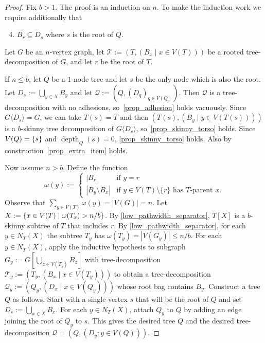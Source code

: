 \documentclass{patmorin}
\renewcommand{\le}{\leqslant}
\newcommand{\torso}[2]{{#1}\langle{#2}\rangle}
\DeclareMathOperator{\depth}{depth}
\DeclarePairedDelimiter{\set}{\{}{\}}
\begin{document}
  \begin{proof}
    Fix $b>1$.
    The proof is an induction on $n$.
    To make the induction work we require additionally that
    \begin{enumerate}[nosep,nolistsep,label=\rm(\alph*)]
    \setcounter{enumi}{3}
    \item\label{prop_extra_item} $B_r \subseteq D_s$ where $s$ is the root of $Q$.
    \end{enumerate}
    Let $G$ be an $n$-vertex graph, let $\mathcal{T}:=(T,(B_x\mid x\in V(T)))$ be a rooted tree-decomposition of $G$, and let $r$ be the root of $T$.

If $n\le b$, let $Q$ be a $1$-node tree and let $s$ be the only node which is also the root.
Let $D_s:=\bigcup_{y\in X} B_y$ and let $\mathcal{Q}:=(Q,(D_q)_{q\in V(Q)})$.
Then $\mathcal{Q}$ is a tree-decomposition with no adhesions, so~\ref{prop_adhesion} holds vacuously.
Since $\torso{G}{D_s}=G$, we can take $T(s)=T$ and then $(T(s),(B_y\mid y\in V(T(s))))$ is a $b$-skinny tree decomposition of $\torso{G}{D_s}$,
so~\ref{prop_skinny_torso} holds.
Since $V(Q)=\set{s}$ and $\depth_Q(s)=0$, \ref{prop_skinny_torso}  holds.
Also by construction~\ref{prop_extra_item} holds.

    Now assume $n> b$.  Define the function     
    \[
        \omega(y) := \begin{cases}
        |B_r| & \text{if $y=r$} \\
        |B_y\setminus B_x| & \text{if $y\in V(T)\setminus\{r\}$ has $T$-parent $x$.}
        \end{cases}
    \]
    Observe that $\sum_{y\in V(T)}\omega(y)=|V(G)|=n$.
    Let $X:=\set{x\in V(T)\mid  \omega(T_x)>n/b}$.
    By \cref{low_pathwidth_separator}, $T[X]$ is a $b$-skinny subtree of $T$ that includes $r$.
    By \cref{low_pathwidth_separator}, for each $y\in N_T(X)$ the subtree $T_y$ has $\omega(T_y)=|V(G_y)|\le n/b$. For each $y\in N_T(X)$, apply the inductive hypothesis to subgraph $G_y:=G[\bigcup_{z\in V(T_y)} B_z]$ with tree-decomposition $\mathcal{T}_y:=(T_y, (B_x\mid x\in V(T_y)))$ to obtain a tree-decomposition $\mathcal{Q}_{y}:=(Q_y,(D_x \mid x\in V(Q_y)))$ whose root bag contains $B_y$.
    Construct a tree $Q$ as follows.
    Start with a single vertex $s$ that will be the root of $Q$ and set $D_s:=\bigcup_{x\in X} B_x$.
    For each $y\in N_T(X)$, attach $Q_y$ to $Q$ by adding an edge joining the root of $Q_y$ to $s$.
    This gives the desired tree $Q$ and the desired tree-decomposition $\mathcal{Q}=(Q,(D_y:y\in V(Q)))$.


\end{proof}
\end{document}
